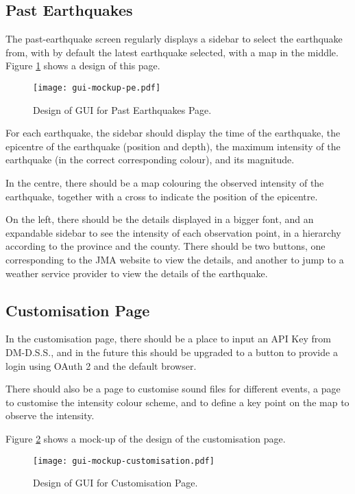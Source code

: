 \subsection{Past Earthquakes}

The past-earthquake screen regularly displays a sidebar to select the earthquake from, with by default the latest earthquake selected, with a map in the middle. Figure \ref{fig:gui-mockup-pe} shows a design of this page.

\begin{figure}[htp]
    \centering
    \texttt{[image: gui-mockup-pe.pdf]}
    \caption{Design of GUI for Past Earthquakes Page.}
    \label{fig:gui-mockup-pe}
\end{figure}

For each earthquake, the sidebar should display the time of the earthquake, the epicentre of the earthquake (position and depth), the maximum intensity of the earthquake (in the correct corresponding colour), and its magnitude.

In the centre, there should be a map colouring the observed intensity of the earthquake, together with a cross to indicate the position of the epicentre.

On the left, there should be the details displayed in a bigger font, and an expandable sidebar to see the intensity of each observation point, in a hierarchy according to the province and the county. There should be two buttons, one corresponding to the JMA website to view the details, and another to jump to a weather service provider to view the details of the earthquake.

\subsection{Customisation Page}

In the customisation page, there should be a place to input an API Key from DM-D.S.S., and in the future this should be upgraded to a button to provide a login using OAuth 2 and the default browser.

There should also be a page to customise sound files for different events, a page to customise the intensity colour scheme, and to define a key point on the map to observe the intensity.

Figure \ref{fig:gui-mockup-customisation} shows a mock-up of the design of the customisation page.

\begin{figure}[htp]
    \centering
    \texttt{[image: gui-mockup-customisation.pdf]}
    \caption{Design of GUI for Customisation Page.}
    \label{fig:gui-mockup-customisation}
\end{figure}

